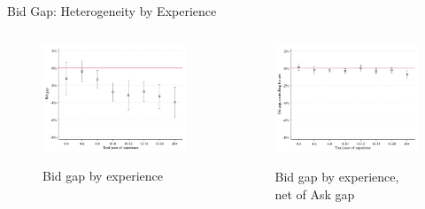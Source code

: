 \begin{frame}{Bid Gap: Heterogeneity by Experience}

    \begin{columns}[T]
        \begin{column}{0.45\textwidth}
            \begin{figure}
                \centering
                \includegraphics[height = 0.57 \textheight]{images/bidgap_hetero_exp.png}
                
                {\footnotesize Bid gap by experience}
            \end{figure}
        \end{column}

        \begin{column}{0.45\textwidth}
            \begin{figure}
                \centering
                \includegraphics[height = 0.57 \textheight]{images/bidgap_hetero_exp_gender.png}
                
                {\footnotesize Bid gap by experience, net of Ask gap}
            \end{figure}
        \end{column}
    \end{columns}
    
\end{frame}

